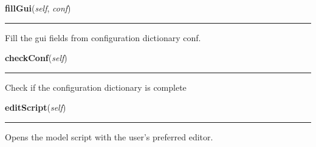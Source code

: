     \label{Epigrass:epigrass:MainPanel_Impl:fillGui}

    \vspace{0.5ex}

    \begin{boxedminipage}{\textwidth}

    \raggedright \textbf{fillGui}(\textit{self}, \textit{conf})

    \vspace{-1.5ex}

    \rule{\textwidth}{0.5\fboxrule}
    Fill the gui fields from configuration dictionary conf.

    \vspace{1ex}

    \end{boxedminipage}

    \label{Epigrass:epigrass:MainPanel_Impl:checkConf}

    \vspace{0.5ex}

    \begin{boxedminipage}{\textwidth}

    \raggedright \textbf{checkConf}(\textit{self})

    \vspace{-1.5ex}

    \rule{\textwidth}{0.5\fboxrule}
    Check if the configuration dictionary is complete

    \vspace{1ex}

    \end{boxedminipage}

    \label{Epigrass:epigrass:MainPanel_Impl:editScript}

    \vspace{0.5ex}

    \begin{boxedminipage}{\textwidth}

    \raggedright \textbf{editScript}(\textit{self})

    \vspace{-1.5ex}

    \rule{\textwidth}{0.5\fboxrule}
    Opens the model script with the user's preferred editor.

    \vspace{1ex}

    \end{boxedminipage}

